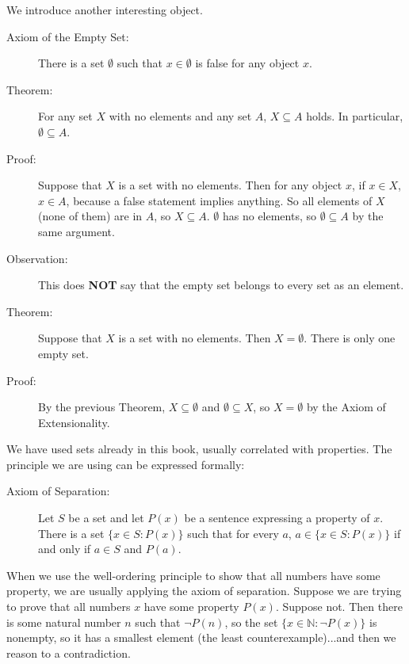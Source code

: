 \documentclass[12pt]{article}
\begin{document}
We introduce another interesting object.

\begin{description}

\item[Axiom of the Empty Set:]  There is a set $\emptyset$ such that $x \in \emptyset$ is false for any object $x$.

\item[Theorem:]  For any set $X$ with no elements and any set $A$, $X \subseteq A$ holds.  In particular, $\emptyset \subseteq A$.

\item[Proof:]  Suppose that $X$ is a set with no elements.  Then for any object $x$, if $x \in X$, $x \in A$, because a false statement implies anything.  So all elements of $X$ (none of them) are in $A$, so $X \subseteq A$.  $\emptyset$ has no elements, so $\emptyset \subseteq A$ by the same argument.

\item[Observation:]  This does {\bf NOT} say that the empty set belongs to every set as an element.

\item[Theorem:]  Suppose that $X$ is a set with no elements.  Then $X = \emptyset$.  There is only one empty set.

\item[Proof:]  By the previous Theorem, $X \subseteq \emptyset$ and $\emptyset \subseteq X$, so $X = \emptyset$ by the Axiom of Extensionality.

\end{description}

We have used sets already in this book, usually correlated with properties.  The principle we are using can be expressed formally:

\begin{description}

\item[Axiom of Separation:]  Let $S$ be a set and let $P(x)$ be a sentence expressing a property of $x$.  There is a set $\{x \in S:P(x)\}$ such that for every $a$, $a \in \{x \in S:P(x)\}$ if and only if $a \in S$ and $P(a)$.

\end{description}

When we use the well-ordering principle to show that all numbers have some property, we are usually applying the axiom of separation.   Suppose we are trying to prove that all numbers $x$ have some property $P(x)$.  Suppose not.  Then there is some natural number $n$ such that $\neg P(n)$, so the set $\{x \in {\mathbb N}:\neg P(x)\}$ is nonempty, so it has a smallest element (the least counterexample)...and then we reason to a contradiction.
\end{document}
